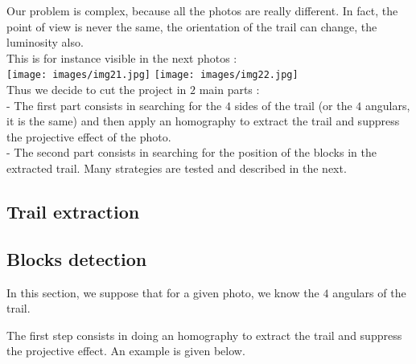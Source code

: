 \documentclass{article}
\begin{document}
Our problem is complex, because all the photos are really different. In fact, the point of view is never the same, the orientation of the trail can change, the luminosity also.\\
This is for instance visible in the next photos :\\
\texttt{[image: images/img21.jpg]} 
\texttt{[image: images/img22.jpg]}\\
Thus we decide to cut the project in $2$ main parts :\\
 - The first part consists in searching for the $4$ sides of the trail (or the $4$ angulars, it is the same) and then apply an homography to extract the trail and suppress the projective effect of the photo.\\
 - The second part consists in searching for the position of the blocks in the extracted trail. Many strategies are tested and described in the next.

\subsection{Trail extraction}

\subsection{Blocks detection}

In this section, we suppose that for a given photo, we know the $4$ angulars of the trail.

The first step consists in doing an homography to extract the trail and suppress the projective effect. An example is given below.
\end{document}
